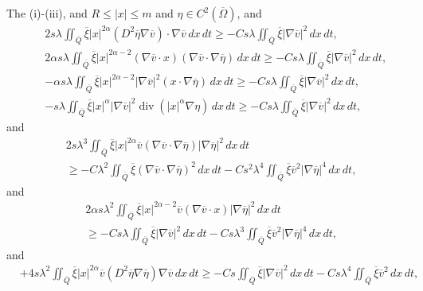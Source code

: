\documentclass[11pt]{article}
\numberwithin{equation}{section}
\DeclareMathOperator{\Div}{div}
\begin{document}
The (i)-(iii), and  $R\leq |x|\leq m$ and $\eta\in C^2(\overline{\Omega})$, and
\begin{eqnarray*}
	&& 2s\lambda\iint_{\overline{Q}}\overline{\xi}|x|^{2\alpha}(D^2\overline{\eta}\nabla \overline{v}) \cdot \nabla \overline{v}\,dx\,dt \geq -Cs\lambda\iint_{\overline{Q}}\overline{\xi} |\nabla \overline{v}|^2\,dx\,dt, \\
	&&2\alpha s\lambda\iint_{\overline{Q}}\overline{\xi}|x|^{2\alpha-2}(\nabla \overline{v} \cdot x)(\nabla \overline{v} \cdot \nabla \overline{\eta})\,dx\,dt \geq -Cs\lambda\iint_{\overline{Q}}\overline{\xi} |\nabla \overline{v}|^2\,dx\,dt,\\
	&&-\alpha s\lambda\iint_{\overline{Q}}\overline{\xi} |x|^{2\alpha-2}|\nabla \overline{v}|^2(x \cdot \nabla \overline{\eta})\,dx\,dt \geq -Cs\lambda \iint_{\overline{Q}}\overline{\xi} |\nabla \overline{v}|^2\,dx\,dt, \\
	&&-s\lambda\iint_{\overline{Q}}\overline{\xi} |x|^\alpha |\nabla \overline{v}|^2\Div(|x|^\alpha \nabla \eta)\,dx\,dt \geq -Cs\lambda \iint_{\overline{Q}}\overline{\xi}|\nabla \overline{v}|^2\,dx\,dt,
\end{eqnarray*}
and
\begin{equation*}
	\begin{split}
		&2s\lambda^3\iint_{\overline{Q}}\overline{\xi} |x|^{2\alpha}\overline{v}(\nabla \overline{v} \cdot \nabla \overline{\eta})|\nabla \overline{\eta}|^2\,dx\,dt\\
		&\geq -C \lambda^2\iint_{\overline{Q}}\overline{\xi} (\nabla \overline{v} \cdot \nabla \overline{\eta})^2\,dx\,dt - Cs^2\lambda^4\iint_{\overline{Q}} \overline{\xi} \overline{v}^2|\nabla \overline{\eta}|^4\,dx\,dt,
	\end{split}
\end{equation*}
and
\begin{equation*}
	\begin{split}
		&2\alpha s\lambda^2\iint_{\overline{Q}}\overline{\xi} |x|^{2\alpha-2}\overline{v}(\nabla\overline{v} \cdot x)|\nabla \overline{\eta}|^2\,dx\,dt\\
		&\geq -Cs\lambda\iint_{\overline{Q}}\overline{\xi} |\nabla \overline{v}|^2\,dx\,dt - Cs\lambda^3\iint_{\overline{Q}}\overline{\xi} \overline{v}^2|\nabla\overline{\eta}|^4\,dx\,dt,
	\end{split}
\end{equation*}
and
\begin{equation*}
	\begin{split}
		&+4s\lambda^2\iint_{\overline{Q}}\overline{\xi} |x|^{2\alpha}\overline{v}(D^2\overline{\eta}\nabla \overline{\eta})\nabla \overline{v}\,dx\,dt \geq -Cs\iint_{\overline{Q}}\overline{\xi} |\nabla \overline{v}|^2\,dx\,dt - Cs\lambda^4\iint_{\overline{Q}} \overline{\xi} \overline{v}^2\,dx\,dt,
	\end{split}
\end{equation*}
\end{document}
